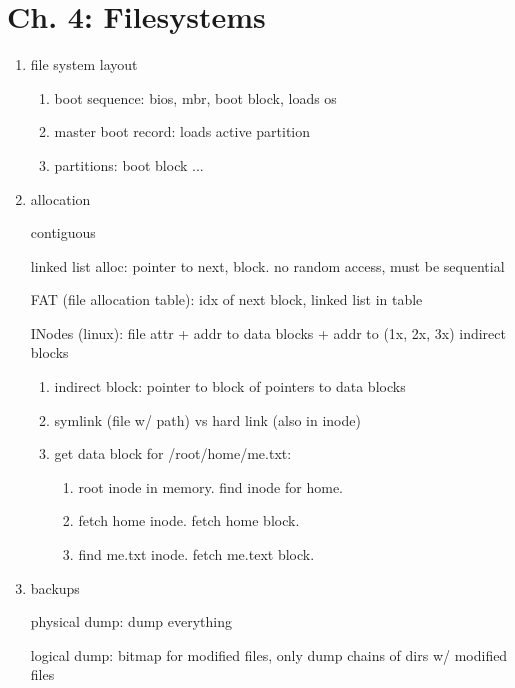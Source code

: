 \documentclass[10pt]{article}
\begin{document}
\section{Ch. 4: Filesystems}
\begin{enumerate}
    \item file system layout
        \begin{enumerate}
            \item boot sequence: bios, mbr, boot block, loads os
            \item master boot record: loads active partition
            \item partitions: boot block ...
        \end{enumerate}

    \item allocation

        contiguous

        linked list alloc: pointer to next, block. no random access, must be sequential

        FAT (file allocation table): idx of next block, linked list in table

        INodes (linux): file attr + addr to data blocks + addr to (1x, 2x, 3x) indirect blocks
        \begin{enumerate}
            \item indirect block: pointer to block of pointers to data blocks
            \item symlink (file w/ path) vs hard link (also in inode)
            \item get data block for /root/home/me.txt:
                \begin{enumerate}
                    \item root inode in memory. find inode for home.
                    \item fetch home inode. fetch home block.
                    \item find me.txt inode. fetch me.text block.
                \end{enumerate}
        \end{enumerate}

    \item backups

        physical dump: dump everything

        logical dump: bitmap for modified files, only dump chains of dirs w/ modified files
\end{enumerate}
\end{document}
